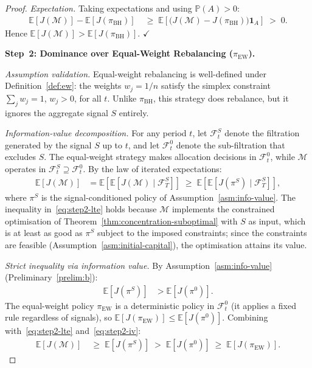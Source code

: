 \documentclass[12pt,openany]{book}
\newcommand{\E}{\mathbb{E}}
\numberwithin{equation}{chapter}
\theoremstyle{plain}
\theoremstyle{definition}
\theoremstyle{remark}
\numberwithin{equation}{chapter}
\theoremstyle{plain}
\begin{document}
\begin{proof}
\medskip
\noindent\textit{Expectation.}
Taking expectations and using $\mathbb{P}(A) > 0$:
\begin{align}
  \E[J(\mathcal{M})] - \E[J(\pi_{\mathrm{BH}})]
  &\;\ge\;
  \E\!\left[
    \bigl(J(\mathcal{M}) - J(\pi_{\mathrm{BH}})\bigr)
    \mathbf{1}_A
  \right]
  \;>\; 0.
  \label{eq:step1-exp}
\end{align}
Hence $\E[J(\mathcal{M})] > \E[J(\pi_{\mathrm{BH}})]$. \hfill$\checkmark$

\bigskip
\noindent\textbf{Step~2: Dominance over Equal-Weight Rebalancing
($\pi_{\mathrm{EW}}$).}

\medskip
\noindent\textit{Assumption validation.}
Equal-weight rebalancing is well-defined under
Definition~\ref{def:ew}: the weights $w_j = 1/n$ satisfy the
simplex constraint $\sum_j w_j = 1$, $w_j > 0$, for all $t$.
Unlike $\pi_{\mathrm{BH}}$, this strategy does rebalance, but
it ignores the aggregate signal $S$ entirely.

\medskip
\noindent\textit{Information-value decomposition.}
For any period $t$, let $\mathcal{F}_t^{S}$ denote the filtration
generated by the signal $S$ up to $t$, and let $\mathcal{F}_t^{0}$
denote the sub-filtration that excludes $S$.  The equal-weight
strategy makes allocation decisions in $\mathcal{F}_t^{0}$, while
$\mathcal{M}$ operates in $\mathcal{F}_t^{S} \supseteq
\mathcal{F}_t^{0}$.  By the law of iterated expectations:
\begin{align}
  \E[J(\mathcal{M})]
  &= \E\!\left[\E[J(\mathcal{M})\mid\mathcal{F}_T^{S}]\right]
  \;\ge\;
  \E\!\left[\E[J(\pi^{S})\mid\mathcal{F}_T^{S}]\right],
  \label{eq:step2-lte}
\end{align}
where $\pi^{S}$ is the signal-conditioned policy of
Assumption~\ref{asm:info-value}.  The inequality in~\eqref{eq:step2-lte}
holds because $\mathcal{M}$ implements the constrained optimisation of
Theorem~\ref{thm:concentration-suboptimal} with $S$ as input, which
is at least as good as $\pi^{S}$ subject to the imposed constraints;
since the constraints are feasible (Assumption~\ref{asm:initial-capital}),
the optimisation attains its value.

\medskip
\noindent\textit{Strict inequality via information value.}
By Assumption~\ref{asm:info-value} (Preliminary~\ref{prelim:b}):
\begin{align}
  \E[J(\pi^{S})] &> \E[J(\pi^{0})].
  \label{eq:step2-iv}
\end{align}
The equal-weight policy $\pi_{\mathrm{EW}}$ is a deterministic
policy in $\mathcal{F}_t^{0}$ (it applies a fixed rule regardless
of signals), so $\E[J(\pi_{\mathrm{EW}})] \le \E[J(\pi^{0})]$.
Combining with~\eqref{eq:step2-lte} and~\eqref{eq:step2-iv}:
\begin{align}
  \E[J(\mathcal{M})]
  &\;\ge\; \E[J(\pi^{S})]
  \;>\; \E[J(\pi^{0})]
  \;\ge\; \E[J(\pi_{\mathrm{EW}})].
  \label{eq:step2-chain}
\end{align}


\end{proof}
\end{document}
